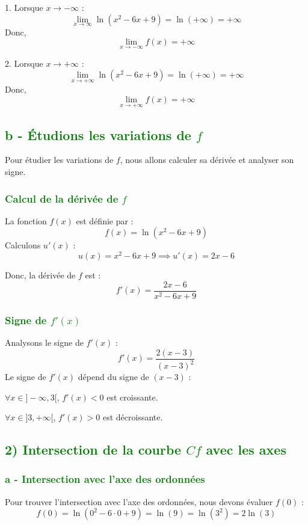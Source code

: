 \documentclass[12pt]{article}
\begin{document}
1. Lorsque \( x \to -\infty \) :
\[
\lim_{x \to \infty}\ln(x^{2}-6x+9)=\ln(+\infty)=+\infty
\]
Donc,
\[
\lim_{x \to -\infty} f(x) = +\infty
\]

2. Lorsque \( x \to +\infty \) :
\[
\lim_{x \to +\infty}\ln(x^{2}-6x+9)=\ln(+\infty)=+\infty
\]
Donc,
\[
\lim_{x \to +\infty} f(x) = +\infty
\]
\subsection*{\textcolor{green}{b - Étudions les variations de \( f \)}}

Pour étudier les variations de \( f \), nous allons calculer sa dérivée et analyser son signe.

\subsubsection*{\textcolor{green}{Calcul de la dérivée de \( f \)}}
La fonction \( f(x) \) est définie par :
\[
f(x) = \ln(x^{2}-6x+9)
\]
Calculons \( u'(x) \) :
\[
u(x) = x^{2}-6x+9 \implies u'(x) = 2x - 6
\]

Donc, la dérivée de \( f \) est :
\[
f'(x) = \frac{2x - 6}{x^{2}-6x+9}
\]

\subsubsection*{\textcolor{green}{Signe de \( f'(x) \)}}
Analysons le signe de \( f'(x) \) :
\[
f'(x) = \frac{2(x - 3)}{(x - 3)^2}
\]
Le signe de \( f'(x) \) dépend du signe de \( (x - 3) \) :

\(\forall x \in ]-\infty, 3[ \), \( f'(x) < 0 \) est croissante.

\(\forall x \in ]3, +\infty[ \), \( f'(x) > 0 \) est décroissante.

\subsection*{\textcolor{green}{2) Intersection de la courbe \( Cf \) avec les axes}}

\subsubsection*{\textcolor{green}{a - Intersection avec l'axe des ordonnées}}

Pour trouver l'intersection avec l'axe des ordonnées, nous devons évaluer \( f(0) \) :
\[
f(0) = \ln(0^2 - 6 \cdot 0 + 9) = \ln(9) = \ln(3^2) = 2 \ln(3)
\]
\end{document}
